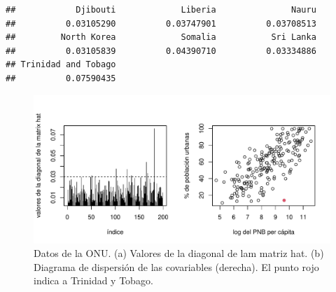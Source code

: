 \documentclass[
]{article}
\newenvironment{Shaded}{\begin{snugshade}}{\end{snugshade}}
\newcommand{\AttributeTok}[1]{\textcolor[rgb]{0.13,0.29,0.53}{#1}}
\newcommand{\DecValTok}[1]{\textcolor[rgb]{0.00,0.00,0.81}{#1}}
\newcommand{\FunctionTok}[1]{\textcolor[rgb]{0.13,0.29,0.53}{\textbf{#1}}}
\newcommand{\NormalTok}[1]{#1}
\newcommand{\SpecialCharTok}[1]{\textcolor[rgb]{0.81,0.36,0.00}{\textbf{#1}}}
\newcommand{\StringTok}[1]{\textcolor[rgb]{0.31,0.60,0.02}{#1}}
\begin{document}
\begin{verbatim}
##            Djibouti             Liberia               Nauru 
##          0.03105290          0.03747901          0.03708513 
##         North Korea             Somalia           Sri Lanka 
##          0.03105839          0.04390710          0.03334886 
## Trinidad and Tobago 
##          0.07590435
\end{verbatim}

\begin{Shaded}
\end{Shaded}

\begin{figure}

{\centering \includegraphics{MLG1_files/figure-latex/Un11Hdiag-1} 

}

\caption{Datos de la ONU. (a) Valores de la diagonal de lam matriz hat. (b) Diagrama de dispersión de las covariables (derecha). El punto rojo indica a Trinidad y Tobago.}\label{fig:Un11Hdiag}
\end{figure}
\end{document}
